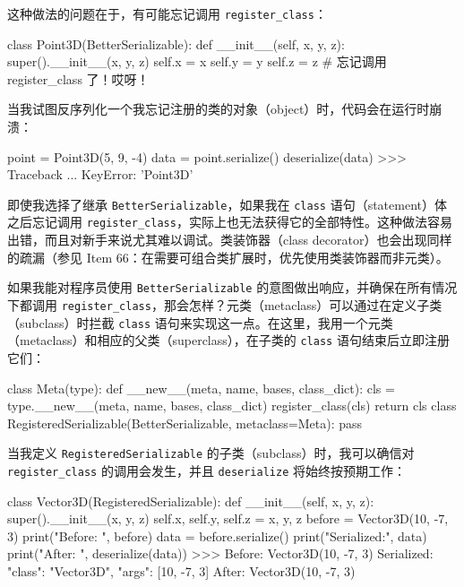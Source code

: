 这种做法的问题在于，有可能忘记调用 \texttt{register\_class}：

\begin{codebox}[python]
class Point3D(BetterSerializable):
    def __init__(self, x, y, z):
        super().__init__(x, y, z)
        self.x = x
        self.y = y
        self.z = z
# 忘记调用 register_class 了！哎呀！
\end{codebox}

当我试图反序列化一个我忘记注册的类的对象（object）时，代码会在运行时崩溃：

\begin{codebox}[python]
point = Point3D(5, 9, -4)
data = point.serialize()
deserialize(data)
>>>
Traceback ...
KeyError: 'Point3D'
\end{codebox}

即使我选择了继承 \texttt{BetterSerializable}，如果我在 \texttt{class} 语句（statement）体之后忘记调用 \texttt{register\_class}，实际上也无法获得它的全部特性。这种做法容易出错，而且对新手来说尤其难以调试。类装饰器（class decorator）也会出现同样的疏漏（参见 Item 66：在需要可组合类扩展时，优先使用类装饰器而非元类）。

如果我能对程序员使用 \texttt{BetterSerializable} 的意图做出响应，并确保在所有情况下都调用 \texttt{register\_class}，那会怎样？元类（metaclass）可以通过在定义子类（subclass）时拦截 \texttt{class} 语句来实现这一点。在这里，我用一个元类（metaclass）和相应的父类（superclass），在子类的 \texttt{class} 语句结束后立即注册它们：

\begin{codebox}[python]
class Meta(type):
    def __new__(meta, name, bases, class_dict):
        cls = type.__new__(meta, name, bases, class_dict)
        register_class(cls)
        return cls
class RegisteredSerializable(BetterSerializable, metaclass=Meta):
    pass
\end{codebox}

当我定义 \texttt{RegisteredSerializable} 的子类（subclass）时，我可以确信对 \texttt{register\_class} 的调用会发生，并且 \texttt{deserialize} 将始终按预期工作：

\begin{codebox}[python]
class Vector3D(RegisteredSerializable):
    def __init__(self, x, y, z):
        super().__init__(x, y, z)
        self.x, self.y, self.z = x, y, z
before = Vector3D(10, -7, 3)
print("Before:    ", before)
data = before.serialize()
print("Serialized:", data)
print("After:     ", deserialize(data))
>>>
Before:     Vector3D(10, -7, 3)
Serialized: {"class": "Vector3D", "args": [10, -7, 3]}
After:      Vector3D(10, -7, 3)
\end{codebox}

